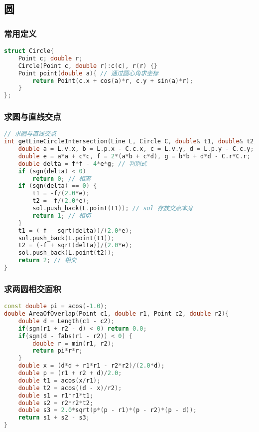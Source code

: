 \subsection{圆}

\subsubsection{常用定义}

\begin{lstlisting}[language=C++]
struct Circle{
    Point c; double r;
    Circle(Point c, double r):c(c), r(r) {}
    Point point(double a){ // 通过圆心角求坐标
        return Point(c.x + cos(a)*r, c.y + sin(a)*r);
    }
};
\end{lstlisting}

\subsubsection{求圆与直线交点}

\begin{lstlisting}[language=C++]
// 求圆与直线交点
int getLineCircleIntersection(Line L, Circle C, double& t1, double& t2, vector<Point>& sol) {
    double a = L.v.x, b = L.p.x - C.c.x, c = L.v.y, d = L.p.y - C.c.y;
    double e = a*a + c*c, f = 2*(a*b + c*d), g = b*b + d*d - C.r*C.r;
    double delta = f*f - 4*e*g; // 判别式
    if (sgn(delta) < 0)
        return 0; // 相离
    if (sgn(delta) == 0) {
        t1 = -f/(2.0*e);
        t2 = -f/(2.0*e);
        sol.push_back(L.point(t1)); // sol 存放交点本身
        return 1; // 相切
    }
    t1 = (-f - sqrt(delta))/(2.0*e);
    sol.push_back(L.point(t1));
    t2 = (-f + sqrt(delta))/(2.0*e);
    sol.push_back(L.point(t2));
    return 2; // 相交
}
\end{lstlisting}

\subsubsection{求两圆相交面积}

\begin{lstlisting}[language=C++]
const double pi = acos(-1.0);
double AreaOfOverlap(Point c1, double r1, Point c2, double r2){
    double d = Length(c1 - c2);
    if(sgn(r1 + r2 - d) < 0) return 0.0;
    if(sgn(d - fabs(r1 - r2)) < 0) {
        double r = min(r1, r2);
        return pi*r*r;
    }
    double x = (d*d + r1*r1 - r2*r2)/(2.0*d);
    double p = (r1 + r2 + d)/2.0;
    double t1 = acos(x/r1);
    double t2 = acos((d - x)/r2);
    double s1 = r1*r1*t1;
    double s2 = r2*r2*t2;
    double s3 = 2.0*sqrt(p*(p - r1)*(p - r2)*(p - d));
    return s1 + s2 - s3;
}
\end{lstlisting}

